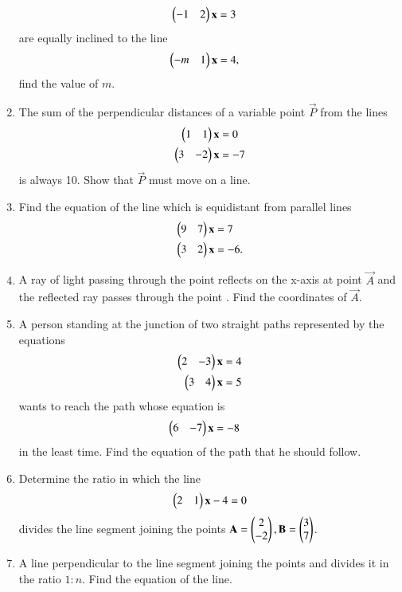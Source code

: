 \begin{enumerate}[label=\arabic*.,ref=\thesubsection.\theenumi]
\begin{align}
\begin{pmatrix}-1 & 2\end{pmatrix}\mathbf{x} &= 3
\end{align}
%
are equally inclined to the line
%
\begin{align}
\begin{pmatrix}-m & 1\end{pmatrix}\mathbf{x} &= 4,
\end{align}
%
find the value of $m$.
%
\item The sum of the perpendicular distances of a variable point $\vec{P}$ from the lines
%
\begin{align}
\begin{pmatrix}1 & 1\end{pmatrix}\mathbf{x} &= 0
\\
\begin{pmatrix}3 & -2\end{pmatrix}\mathbf{x} &= -7
\end{align}
%
is always 10.  Show that $\vec{P}$ must move on a line.
%
\item Find the equation of the line which is equidistant from parallel lines
%
\begin{align}
\begin{pmatrix}9 & 7\end{pmatrix}\mathbf{x} &= 7
\\
\begin{pmatrix}3 & 2\end{pmatrix}\mathbf{x} &= -6.
\end{align}
%
\item A ray of light passing through the point  reflects on the x-axis at point $\vec{A}$ and the reflected ray passes through the point .  Find the coordinates of $\vec{A}$.
\item A person standing at the junction of two straight paths represented by the equations 
%
\begin{align}
\begin{pmatrix}2 & -3\end{pmatrix}\mathbf{x} &= 4
\\
\begin{pmatrix}3 & 4\end{pmatrix}\mathbf{x} &= 5
\end{align}
%
wants to reach the path whose equation is
%
\begin{align}
\begin{pmatrix}6 & -7\end{pmatrix}\mathbf{x} &= -8
\end{align}
%
in the least time.  Find the equation of the path that he should follow.
\\
\solution

\item Determine the ratio in which the line 
\begin{align}
\begin{pmatrix}2 & 1\end{pmatrix}\mathbf{x} - 4 = 0
\end{align}
%
divides the line segment joining the points $\mathbf{A}=\begin{pmatrix}2\\-2\end{pmatrix}, \mathbf{B}=\begin{pmatrix}3\\7\end{pmatrix}$.
\item A line perpendicular to the line segment joining the points  and  divides it in the ratio $1:n$.  Find the equation of the line.

\end{enumerate}
